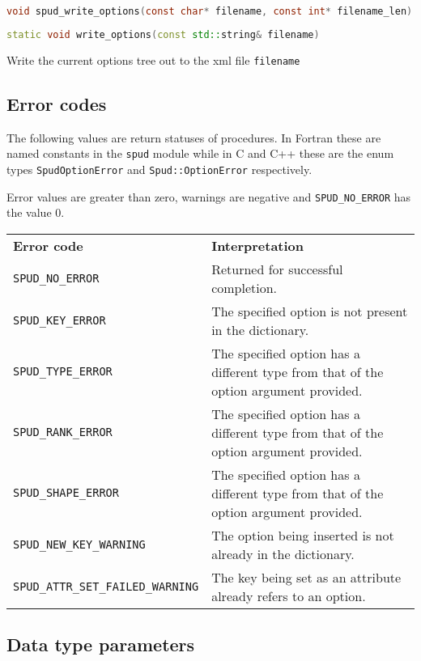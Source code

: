 \documentclass[a4paper, 11pt]{book}
\begin{document}
\begin{lstlisting}[language=C]
void spud_write_options(const char* filename, const int* filename_len)
\end{lstlisting}

\begin{lstlisting}[language=C++]
static void write_options(const std::string& filename)
\end{lstlisting}

Write the current options tree out to the xml file \lstinline+filename+

\subsection{Error codes}\label{sec:error_codes}

The following values are return statuses of procedures. In Fortran these are
named constants in the \lstinline+spud+ module while in C and C++ these are
the enum types \lstinline+SpudOptionError+ and \lstinline+Spud::OptionError+
respectively. 

Error values are greater than zero, warnings are negative and
\lstinline+SPUD_NO_ERROR+ has the value 0.

\begin{tabular}{lp{8cm}}
  \textbf{Error code} & \textbf{Interpretation}\\
  \lstinline+SPUD_NO_ERROR+ & Returned for successful completion.\\
  \lstinline+SPUD_KEY_ERROR+ & The specified option is not present in the
  dictionary.\\
  \lstinline+SPUD_TYPE_ERROR+ & The specified option has a different type
  from that of the option argument provided.\\
  \lstinline+SPUD_RANK_ERROR+ & The specified option has a different type
  from that of the option argument provided.\\
  \lstinline+SPUD_SHAPE_ERROR+ & The specified option has a different type
  from that of the option argument provided.\\
  \lstinline+SPUD_NEW_KEY_WARNING+ & The option being inserted is not
  already in the dictionary.\\
  \lstinline+SPUD_ATTR_SET_FAILED_WARNING+ & The key being set as an
  attribute already refers to an option.
\end{tabular}

\subsection{Data type parameters}\label{sec:types}
\end{document}
